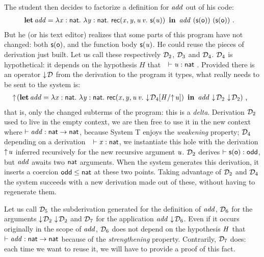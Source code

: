 \documentclass{llncs}
\begin{document}
The student then decides to factorize a definition for $\text{\textit{add}}$ out
of his code:
\begin{align*}
  &\operatorname{\bf let}{{\text{\textit{add}}}}={\lambda{\ensuremath{\text{\textit{x}}}}:{\text{\textsf{nat}}}.\  \lambda{\ensuremath{\text{\textit{y}}}}:{\text{\textsf{nat}}}.\  \text{\textsf{rec}}({\text{\textit{x}}},{\text{\textit{y}}},{\text{\textit{u}}}\,{\text{\textit{v}}}.\ {\text{\textsf{s}} ({\text{\textit{u}}})})}\ \operatorname{\bf in}\ 
  {\text{\textit{add}}}\ {(\text{\textsf{s}} ({\text{\textsf{o}}}))}\ {(\text{\textsf{s}} ({\text{\textsf{o}}}))} \ \text{.}
\end{align*}
But he (or his text editor) realizes that some parts of this program
have not changed: both $\text{\textsf{s}} ({\text{\textsf{o}}})$, and the function body $\text{\textsf{s}} ({\text{\textit{u}}})$. He
could reuse the pieces of derivation just built. Let us call these
respectively $\mathcal D_2$, $\mathcal D_3$ and $\mathcal D_4$. $\mathcal D_4$ is hypothetical: it
depends on the hypothesis $H$ that\ \ $\vdash \text{\textit{u}}:\text{\textsf{nat}}$ .
Provided there is an operator $\downarrow\!{\mathcal D}$ from the derivation to the
program it types, what really needs to be sent to the system is:
\begin{align*}
  &\uparrow\!{}(
    \operatorname{\bf let}{{\text{\textit{add}}}}={\lambda{\ensuremath{\text{\textit{x}}}}:{\text{\textsf{nat}}}.\  \lambda{\ensuremath{\text{\textit{y}}}}:{\text{\textsf{nat}}}.\  \text{\textsf{rec}}({\text{\textit{x}}},{\text{\textit{y}}},{\text{\textit{u}}}\,{\text{\textit{v}}}.\ {\downarrow\!{{\mathcal D_4}[{{\text{\textit{H}}}/{\uparrow\!{\text{\textit{u}}}}}]}})}\ \operatorname{\bf in}\ 
    {\text{\textit{add}}}\ {\downarrow\!{\mathcal D_2}}\ {\downarrow\!{\mathcal D_2}}
  )
\ \text{,}
\end{align*}
that is, only the changed subterms of the program: this is a
\emph{delta}. Derivation $\mathcal D_2$ used to live in the empty context, we
are then free to use it in the new context where
$\vdash\text{\textit{add}}:\text{\textsf{nat}}\to\text{\textsf{nat}}$, because System \sysname T
enjoys the \emph{weakening} property; $\mathcal D_4$ depending on a
derivation\ \ $\vdash\text{\textit{x}}:\text{\textsf{nat}}$, we instantiate this hole with
the derivation $\uparrow\!{\text{\textit{u}}}$ inferred recursively for the new
recursive argument $\text{\textit{u}}$. $\mathcal D_2$ derives $\vdash \text{\textsf{s}} ({\text{\textsf{o}}}) :
\text{\textsf{odd}}$, but $\text{\textit{add}}$ awaits two $\text{\textsf{nat}}$ arguments. When the
system generates this derivation, it inserts a coercion $\text{\textsf{odd}}
\leq \text{\textsf{nat}}$ at these two points. Taking advantage of $\mathcal D_2$ and
$\mathcal D_4$ the system succeeds with a new derivation made out of these,
without having to regenerate them.

Let us call $\mathcal D_5$ the subderivation generated for the definition of
$\text{\textit{add}}$, $\mathcal D_6$ for the arguments
${\downarrow\!{\mathcal D_2}}\ {\downarrow\!{\mathcal D_2}}$ and $\mathcal D_7$ for the application
${\text{\textit{add}}}\  {\downarrow\!{\mathcal D_6}}$. Even if it occurs originally in the
scope of $\text{\textit{add}}$, $\mathcal D_6$ does not depend on the hypothesis $\text{\textit{H}}$ that $\vdash \text{\textit{add}}:\text{\textsf{nat}}\to\text{\textsf{nat}}$ because of the
\emph{strengthening} property. Contrarily, $\mathcal D_7$ does: each time we
want to reuse it, we will have to provide a proof of this fact.
\end{document}
